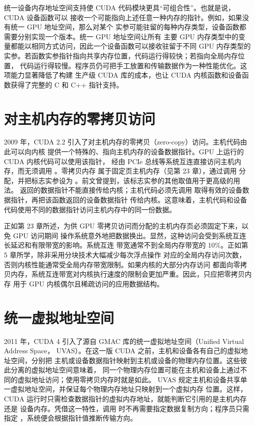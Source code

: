 统一设备内存地址空间支持使 CUDA 代码模块更具“可组合性”。也就是说，CUDA 设备函数可以
接收一个可能指向上述任意一种内存的指针。例如，如果没有统一 GPU 地址空间，那么对某个
实参可能驻留的每种内存类型，设备函数都需要分别实现一个版本。统一 GPU 地址空间让所有
主要 GPU 内存类型中的变量都能以相同方式访问，因此一个设备函数可以接收驻留于不同 GPU
内存类型的实参。若函数实参指针指向共享内存位置，代码运行得较快；若指向全局内存位置，
代码运行得较慢。程序员仍可把手工放置和传输数据作为一种性能优化。这项能力显著降低了构建
生产级 CUDA 库的成本，也让 CUDA 内核函数和设备函数获得了完整的 C 和 C++ 指针支持。

\section{对主机内存的零拷贝访问}
\label{sec:appc-zero-copy}

2009 年，CUDA 2.2 引入了对主机内存的零拷贝（zero-copy）访问。主机代码由此可以向内核
提供一个特殊的、指向主机内存的设备数据指针。GPU 上运行的 CUDA 内核代码可以使用该指针，
经由 PCIe 总线等系统互连直接访问主机内存，而无须调用 。零拷贝内存
属于固定页主机内存（见第 23 章），通过调用  分配，并把标志实参设为
。前文曾提到，该标志实参的其他取值用于更高级的用法。
 返回的数据指针不能直接传给内核；主机代码必须先调用
 取得有效的设备数据指针，再把该函数返回的设备数据指针
传给内核。这意味着，主机代码和设备代码使用不同的数据指针访问主机内存中的同一份数据。

正如第 23 章所述，为供 GPU 零拷贝访问而分配的主机内存页必须固定下来，以免 GPU 访问期间
操作系统意外地把数据换出。显然，这种访问会受到系统互连长延迟和有限带宽的影响。系统互连
带宽通常不到全局内存带宽的 10\%。正如第 5 章所学，除非采用分块技术大幅减少每次浮点操作
对应的全局内存访问次数，否则内核性能通常受全局内存带宽限制。如果内核的大部分内存访问
都面向零拷贝内存，系统互连带宽对内核执行速度的限制会更加严重。因此，只应把零拷贝内存
用于 GPU 内核偶尔且稀疏访问的应用数据结构。

\section{统一虚拟地址空间}
\label{sec:appc-uvas}

2011 年，CUDA 4 引入了源自 GMAC 库的统一虚拟地址空间（Unified Virtual Address Space，
UVAS）\cite{appc-gelado}。在这一版 CUDA 之前，主机和设备各有自己的虚拟地址空间，分别把
主机或设备数据指针映射到主机或设备的物理内存位置。这些彼此分离的虚拟地址空间意味着，
同一个物理内存位置可能在主机和设备上通过不同的虚拟地址访问；使用零拷贝内存时就是如此。
UVAS 规定主机和设备共享单一虚拟地址空间，并保证每个物理内存地址只映射到一个虚拟内存
位置。这样，CUDA 运行时只需检查数据指针的虚拟内存地址，就能判断它引用的是主机内存还是
设备内存。凭借这一特性，调用  时不再需要指定数据复制方向；程序员只需
指定 ，系统便会根据指针值推断传输方向。

